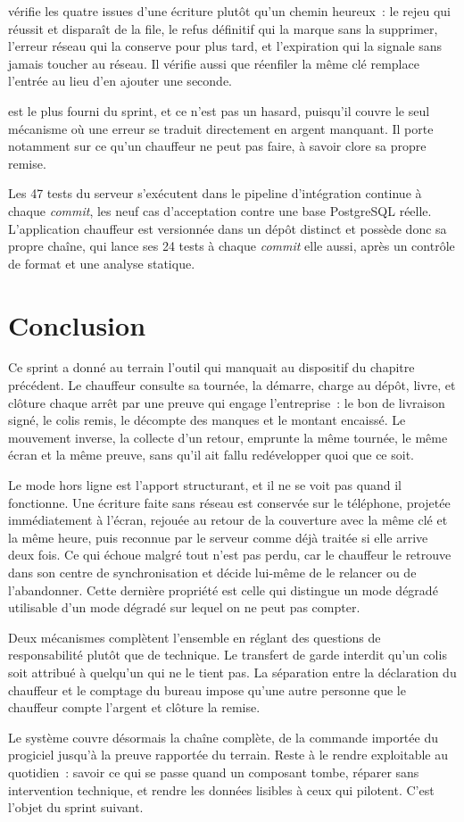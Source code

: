  vérifie les quatre issues d'une écriture plutôt qu'un chemin
heureux~: le rejeu qui réussit et disparaît de la file, le refus définitif qui la marque sans la
supprimer, l'erreur réseau qui la conserve pour plus tard, et l'expiration qui la signale sans jamais
toucher au réseau. Il vérifie aussi que réenfiler la même clé remplace l'entrée au lieu d'en ajouter
une seconde.

 est le plus fourni du sprint, et ce n'est pas un hasard, puisqu'il
couvre le seul mécanisme où une erreur se traduit directement en argent manquant. Il porte notamment sur ce
qu'un chauffeur ne peut pas faire, à savoir clore sa propre remise.

Les 47 tests du serveur s'exécutent dans le pipeline d'intégration continue à chaque \emph{commit},
les neuf cas d'acceptation contre une base PostgreSQL réelle. L'application chauffeur est versionnée
dans un dépôt distinct et possède donc sa propre chaîne, qui lance ses 24 tests à chaque
\emph{commit} elle aussi, après un contrôle de format et une analyse statique.

\section{Conclusion}

Ce sprint a donné au terrain l'outil qui manquait au dispositif du chapitre précédent. Le chauffeur
consulte sa tournée, la démarre, charge au dépôt, livre, et clôture chaque arrêt par une preuve qui
engage l'entreprise~: le bon de livraison signé, le colis remis, le décompte des manques et le
montant encaissé. Le mouvement inverse, la collecte d'un retour, emprunte la même tournée, le même
écran et la même preuve, sans qu'il ait fallu redévelopper quoi que ce soit.

Le mode hors ligne est l'apport structurant, et il ne se voit pas quand il fonctionne. Une écriture
faite sans réseau est conservée sur le téléphone, projetée immédiatement à l'écran, rejouée au retour
de la couverture avec la même clé et la même heure, puis reconnue par le serveur comme déjà traitée
si elle arrive deux fois. Ce qui échoue malgré tout n'est pas perdu, car le chauffeur le retrouve dans
son centre de synchronisation et décide lui-même de le relancer ou de l'abandonner. Cette dernière
propriété est celle qui distingue un mode dégradé utilisable d'un mode dégradé sur lequel on ne peut
pas compter.

Deux mécanismes complètent l'ensemble en réglant des questions de responsabilité plutôt que de
technique. Le transfert de garde interdit qu'un colis soit attribué à quelqu'un qui ne le tient pas.
La séparation entre la déclaration du chauffeur et le comptage du bureau impose qu'une autre personne
que le chauffeur compte l'argent et clôture la remise.

Le système couvre désormais la chaîne complète, de la commande importée du progiciel jusqu'à la
preuve rapportée du terrain. Reste à le rendre exploitable au quotidien~: savoir ce qui se passe
quand un composant tombe, réparer sans intervention technique, et rendre les données lisibles à ceux
qui pilotent. C'est l'objet du sprint suivant.
